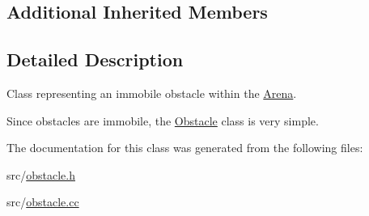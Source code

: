 \subsection*{Additional Inherited Members}


\subsection{Detailed Description}
Class representing an immobile obstacle within the \hyperlink{classArena}{Arena}. 

Since obstacles are immobile, the \hyperlink{classObstacle}{Obstacle} class is very simple. 

The documentation for this class was generated from the following files\+:\begin{DoxyCompactItemize}
\item 
src/\hyperlink{obstacle_8h}{obstacle.\+h}\item 
src/\hyperlink{obstacle_8cc}{obstacle.\+cc}\end{DoxyCompactItemize}
